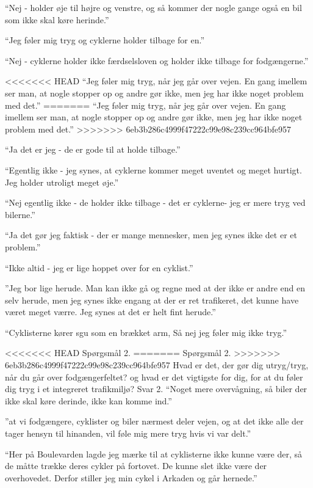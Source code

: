 \begin{appendics}
\begin{appendics}
“Nej - holder øje til højre og venstre, og så kommer der nogle gange også en bil som ikke skal køre herinde.”

“Jeg føler mig tryg og cyklerne holder tilbage for en.”

“Nej - cyklerne holder ikke færdselsloven og holder ikke tilbage for fodgængerne.”

<<<<<<< HEAD
“Jeg føler mig tryg, når jeg går over vejen. En gang imellem ser man, at nogle stopper op og andre gør ikke, men jeg har ikke noget problem med det.”
=======
“Jeg føler mig tryg, når jeg går over vejen. En gang imellem ser man, at nogle stopper op og andre gør ikke, men jeg har ikke noget problem med det.” 
>>>>>>> 6eb3b286c4999f47222c99e98c239cc964bfe957

“Ja det er jeg - de er gode til at holde tilbage.”

“Egentlig ikke - jeg synes, at cyklerne kommer meget uventet og meget hurtigt. Jeg holder utroligt meget øje.”

“Nej egentlig ikke - de holder ikke tilbage - det er cyklerne- jeg er mere tryg ved bilerne.”

“Ja det gør jeg faktisk - der er mange mennesker, men jeg synes ikke det er et problem.”

“Ikke altid - jeg er lige hoppet over for en cyklist.”

”Jeg bor lige herude. Man kan ikke gå og regne med at der ikke er andre end en selv herude, men jeg synes ikke engang at der er ret trafikeret, det kunne have været meget værre. Jeg synes at det er helt fint herude.”

“Cyklisterne kører sgu som en brækket arm, Så nej jeg føler mig ikke tryg.”

<<<<<<< HEAD
Spørgsmål 2.
=======
Spørgsmål 2. 
>>>>>>> 6eb3b286c4999f47222c99e98c239cc964bfe957
Hvad er det, der gør dig utryg/tryg, når du går over fodgængerfeltet? og hvad er det vigtigste for dig, for at du føler dig tryg i et integreret trafikmiljø?
 Svar 2.
“Noget mere overvågning, så biler der ikke skal køre derinde, ikke kan komme ind.”

”at vi fodgængere, cyklister og biler nærmest deler vejen, og at det ikke alle der tager hensyn til hinanden, vil føle mig mere tryg hvis vi var delt.”

“Her på Boulevarden lagde jeg mærke til at cyklisterne ikke kunne være der, så de måtte trække deres cykler på fortovet. De kunne slet ikke være der overhovedet.  Derfor stiller jeg min cykel i Arkaden og går hernede.”


\end{appendics}
\end{appendics}
